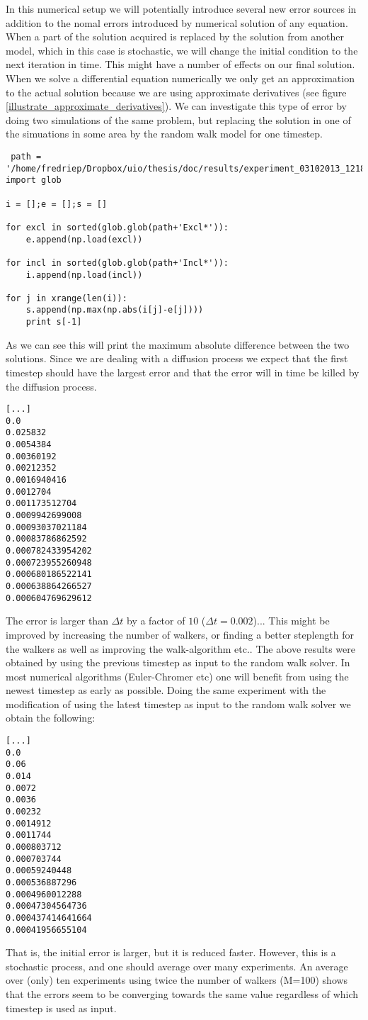 In this numerical setup we will potentially introduce several new error sources in addition to the nomal errors introduced by numerical solution of any equation. 
When a part of the solution acquired is replaced by the solution from another model, which in this case is stochastic, we will change the initial condition to the next iteration in time. 
This might have a number of effects on our final solution. 
When we solve a differential equation numerically we only get an approximation to the actual solution because we are using approximate derivatives (see figure \ref{illustrate_approximate_derivatives}). 
We can investigate this type of error by doing two simulations of the same problem, but replacing the solution in one of the simuations in some area by the random walk model for one timestep. 

\begin{lstlisting}
 path = '/home/fredriep/Dropbox/uio/thesis/doc/results/experiment_03102013_1218/results/'
import glob

i = [];e = [];s = []

for excl in sorted(glob.glob(path+'Excl*')):
	e.append(np.load(excl))

for incl in sorted(glob.glob(path+'Incl*')):
	i.append(np.load(incl))

for j in xrange(len(i)):
	s.append(np.max(np.abs(i[j]-e[j])))
	print s[-1]
\end{lstlisting}
As we can see this will print the maximum absolute difference between the two solutions. 
Since we are dealing with a diffusion process we expect that the first timestep should have the largest error and that the error will in time be killed by the diffusion process. 
\begin{lstlisting}
[...]
0.0
0.025832
0.0054384
0.00360192
0.00212352
0.0016940416
0.0012704
0.001173512704
0.0009942699008
0.00093037021184
0.00083786862592
0.000782433954202
0.000723955260948
0.000680186522141
0.000638864266527
0.000604769629612

\end{lstlisting}
The error is larger than $\Delta t$ by a factor of $10$ ($\Delta t = 0.002$)... 
This might be improved by increasing the number of walkers, or finding a better steplength for the walkers as well as improving the walk-algorithm etc..
The above results were obtained by using the previous timestep as input to the random walk solver. 
In most numerical algorithms (Euler-Chromer etc) one will benefit from using the newest timestep as early as possible. 
Doing the same experiment with the modification of using the latest timestep as input to the random walk solver we obtain the following:
\begin{lstlisting}
[...]
0.0
0.06
0.014
0.0072
0.0036
0.00232
0.0014912
0.0011744
0.000803712
0.000703744
0.00059240448
0.000536887296
0.0004960012288
0.00047304564736
0.000437414641664
0.00041956655104
\end{lstlisting}
That is, the initial error is larger, but it is reduced faster. 
However, this is a stochastic process, and one should average over many experiments. 
An average over (only) ten experiments using twice the number of walkers (M=100) shows that the errors seem to be converging towards the same value regardless of which timestep is used as input.

